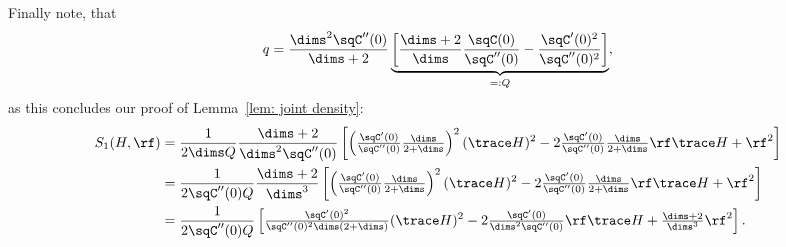 Finally note, that
\[
	q = \frac{\dims^2\sqC''(0)}{\dims+2}
	\underbrace{
	\left[
		\frac{\dims +2}{\dims}\frac{\sqC(0)}{\sqC''(0)} - \frac{\sqC'(0)^2}{\sqC''(0)^2}
	\right]
	}_{=:Q},
\]
as this concludes our proof of Lemma~\ref{lem: joint density}:
\begin{align*}
	S_1(H, \rf)
	&= \frac1{2\dims Q}\frac{\dims+2}{\dims^2\sqC''(0)}
	\left[
		\left(\tfrac{\sqC'(0)}{\sqC''(0)}\tfrac{\dims}{2+\dims}\right)^2(\trace H)^2
		- 2\tfrac{\sqC'(0)}{\sqC''(0)}\tfrac{\dims}{2+\dims}\rf \trace H
		+ \rf^2
	\right]\\
	&= \frac1{2\sqC''(0)Q}\frac{\dims+2}{\dims^3}
	\left[
		\left(\tfrac{\sqC'(0)}{\sqC''(0)}\tfrac{\dims}{2+\dims}\right)^2(\trace H)^2
		- 2\tfrac{\sqC'(0)}{\sqC''(0)}\tfrac{\dims}{2+\dims} \rf\trace H
		+ \rf^2
	\right]\\
	&= \frac1{2\sqC''(0)Q}
	\left[
		\tfrac{\sqC'(0)^2}{\sqC''(0)^2\dims(2+\dims)}(\trace H)^2
		- 2\tfrac{\sqC'(0)}{\dims^2\sqC''(0)}\rf\trace H
		+ \tfrac{\dims+2}{\dims^3}\rf^2
	\right].
\end{align*}